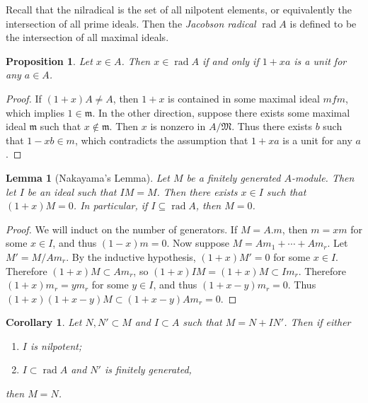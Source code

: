 \documentclass[leqno, openany]{memoir}
\newtheorem{cor}[thm]{Corollary}
\newtheorem{prop}[thm]{Proposition}
\newtheorem{lem}[thm]{Lemma}
\theoremstyle{definition}
\theoremstyle{remark}
\theoremstyle{plain}
\theoremstyle{definition}
\theoremstyle{remark}
\newcommand{\mf}[1]{\mathfrak{#1}}
\begin{document}
Recall that the nilradical is the set of all nilpotent elements, or equivalently the intersection of all prime ideals. Then the \textit{Jacobson radical} $\operatorname{rad} A$ is defined to be the intersection of all maximal ideals.

\begin{prop}
    Let $x \in A$. Then $x \in \operatorname{rad} A$ if and only if $1+xa$ is a unit for any $a \in A$.
\end{prop}

\begin{proof}
    If $(1+x)A \neq A$, then $1+x$ is contained in some maximal ideal $mf{m}$, which implies $1 \in \mf{m}$. In the other direction, suppose there exists some maximal ideal $\mf{m}$ such that $x \notin \mathfrak{m}$. Then $x$ is nonzero in $A/ \mathfrak{M}$. Thus there exists $b$ such that $1-xb \in m$, which contradicts the assumption that $1+xa$ is a unit for any $a$.
\end{proof}

\begin{lem}[Nakayama's Lemma]
    Let $M$ be a finitely generated $A$-module. Then let $I$ be an ideal such that $IM = M$. Then there exists $x \in I$ such that $(1+x) M = 0$. In particular, if $I \subseteq \operatorname{rad} A$, then $M = 0$.
\end{lem}

\begin{proof}
    We will induct on the number of generators. If $M = A.m$, then $m = xm$ for some $x \in I$, and thus $(1-x)m = 0$. Now suppose $M = Am_1 + \cdots + Am_r$. Let $M' = M / Am_r$. By the inductive hypothesis, $(1+x)M' = 0$ for some $x \in I$.  Therefore $(1+x)M \subset A m_r$, so $(1+x) IM = (1+x)M \subset I m_r$. Therefore $(1+x) m_r = y m_r$ for some $y \in I$, and thus $(1+x - y) m_r = 0$. Thus $(1+x)(1+x-y) M \subset (1+x-y)A m_r = 0$.
\end{proof}

\begin{cor}
    Let $N, N' \subset M$ and $I \subset A$ such that $M = N + I N'$. Then if either
    \begin{enumerate}
        \item $I$ is nilpotent;
        \item $I \subset \operatorname{rad} A$ and $N'$ is finitely generated,
    \end{enumerate}
    then $M = N$.
\end{cor}
\end{document}
